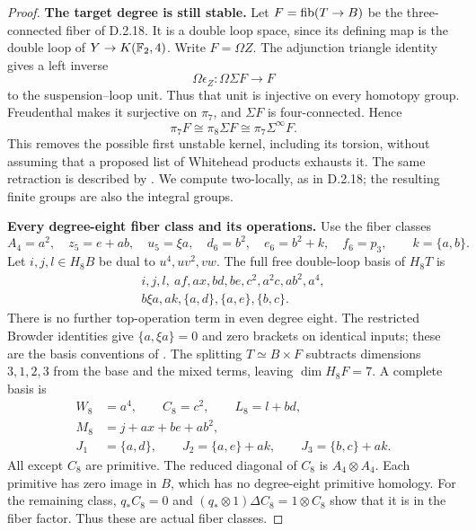 \begin{proof}
\textbf{The target degree is still stable.}
Let $F=\operatorname{fib}(T\to B)$ be the three-connected fiber of D.2.18.
It is a double loop space, since its defining map is the
double loop of $Y\to K(\mathbb F_2,4)$. Write $F=\Omega Z$.
The adjunction triangle identity gives a left inverse
\[
 \Omega\epsilon_Z:\Omega\Sigma F\longrightarrow F
\]
to the suspension--loop unit. Thus that unit is injective
on every homotopy group. Freudenthal makes it surjective
on $\pi_7$, and $\Sigma F$ is four-connected. Hence
\[
 \pi_7F\cong\pi_8\Sigma F\cong\pi_7\Sigma^\infty F.
 \tag{D.2.19c}
\]
This removes the possible first unstable kernel, including
its torsion, without assuming that a proposed list of
Whitehead products exhausts it. The same retraction is
described by \cite[Theorem~1.8, p.~173]{I_James1955}.
We compute two-locally, as in D.2.18; the resulting finite
groups are also the integral groups.

\medskip\noindent
\textbf{Every degree-eight fiber class and its operations.}
Use the fiber classes
\[
 A_4=a^2,\quad z_5=e+ab,\quad u_5=\xi a,\quad
 d_6=b^2,\quad e_6=b^2+k,\quad f_6=p_3,
 \qquad k=\{a,b\}.
\]
Let $i,j,l\in H_8B$ be dual to $u^4,uv^2,vw$.
The full free double-loop basis of $H_8T$ is
\[
\begin{gathered}
 i,j,l,\ af,ax,bd,be,c^2,a^2c,ab^2,a^4,\\
 b\xi a,ak,\{a,d\},\{a,e\},\{b,c\}.
\end{gathered}
 \tag{D.2.19d}
\]
There is no further top-operation term in even degree eight.
The restricted Browder identities give
$\{a,\xi a\}=0$ and zero brackets on identical inputs;
these are the basis conventions of
\cite[Chapter~III, Theorems~1.2--1.4]{I_CohenLadaMay1976}.
The splitting $T\simeq B\times F$ subtracts dimensions
$3,1,2,3$ from the base and the mixed terms, leaving
$\dim H_8F=7$. A complete basis is
\[
\begin{split}
 W_8&=a^4,\qquad C_8=c^2,\qquad L_8=l+bd,\\
 M_8&=j+ax+be+ab^2,\\
 J_1&=\{a,d\},\qquad
 J_2=\{a,e\}+ak,\qquad J_3=\{b,c\}+ak.
\end{split}
 \tag{D.2.19e}
\]
All except $C_8$ are primitive. The reduced diagonal of
$C_8$ is $A_4\otimes A_4$. Each primitive has zero image
in $B$, which has no degree-eight primitive homology.
For the remaining class, $q_*C_8=0$ and
$(q_*\otimes1)\Delta C_8=1\otimes C_8$ show that it is
in the fiber factor. Thus these are actual fiber classes.


\end{proof}
